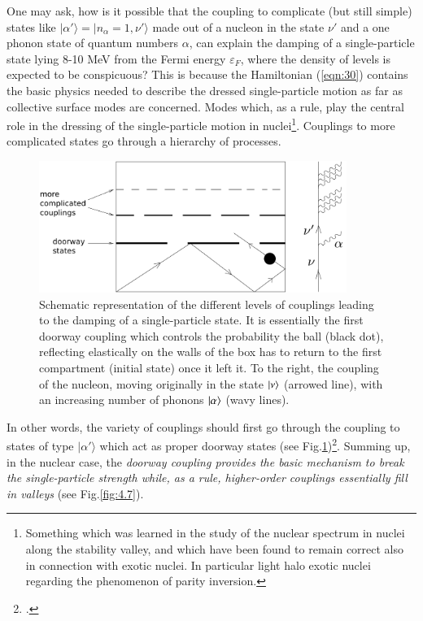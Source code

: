 One may ask, how  is it possible that the coupling to complicate (but still simple) states like $|\alpha'\rangle = |n_\alpha = 1,\nu'\rangle$ made out of a nucleon in the state $\nu'$ and a one phonon state of quantum numbers $\alpha$, can explain the  damping of a single-particle state lying 8-10 MeV from the Fermi energy $\varepsilon_F$, where the density of levels  is expected to be conspicuous? This is because the Hamiltonian  (\ref{eqn:30}) contains  the basic physics needed to describe the dressed single-particle motion as far as collective surface modes are concerned. Modes which, as a rule, play the central role in the dressing of the single-particle motion in nuclei\footnote{Something which was learned in the study of the nuclear spectrum in nuclei along the stability valley, and which have been found to remain correct also in connection with exotic nuclei. In particular light halo exotic nuclei regarding the phenomenon of parity inversion.}. Couplings to more complicated states  go through a hierarchy of processes.
\begin{figure}[h!]
\centerline {
\includegraphics*[width=10cm]{introduccion/figs/figintroD6}
}
\caption[Hierarchical damping of single-particle states.]{Schematic representation of the different levels of couplings leading to the damping of a single-particle state. It is essentially the first doorway coupling which controls the probability the ball (black dot), reflecting elastically on the walls of the box has to return to the first compartment (initial state) once it left it. To the right, the coupling of the nucleon, moving originally in the state $|{\nu} \rangle$ (arrowed line), with an increasing number of phonons $|{\alpha} \rangle$ (wavy lines).}
\label{fig:4.6}
\end{figure}
In other words, the variety of couplings  should first go  through the coupling to states of type $|\alpha'\rangle$ which act as proper doorway states (see Fig.\ref{fig:4.6})\footnote{\cite{Feshbach:58}.}. Summing up, in  the nuclear case, the {\it doorway coupling provides the basic mechanism to break  the single-particle strength while, as a rule, higher-order couplings essentially   fill in valleys} (see Fig.\ref{fig:4.7}).

